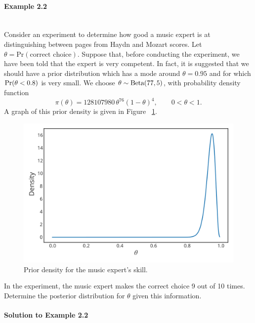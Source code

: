 \paragraph{Example 2.2}{~\\
Consider an experiment to determine how good a music expert is at \label{ex:mozart} distinguishing between pages from Haydn and Mozart scores. Let $\theta=\text{Pr}(\text{correct choice})$. Suppose that, before conducting the experiment, we have been told that the expert is very competent. In fact, it is suggested that we should have a prior distribution which has a mode around $\theta=0.95$ and for which $\textnormal{Pr}(\theta<0.8)$ is very small. We choose $\theta\sim \textnormal{\text{Beta}}(77,5)$, with probability density function
\begin{equation}
\pi(\theta)=128107980\,\theta^{76}(1-\theta)^4,\quad\quad 0<\theta<1.
\label{eq:p3}
\end{equation}
A graph of this prior density is given in Figure ~\ref{fig:betaplot3}.
\begin{figure}[ht]

\includegraphics{images/priorplot2.svg}
\caption{Prior density for the music expert's skill.}
\label{fig:betaplot3}

\end{figure}

In the experiment, the music expert makes the correct choice 9 out of 10 times. Determine the posterior distribution for $\theta$ given this information.

\paragraph{Solution to Example 2.2}{
    
}}
